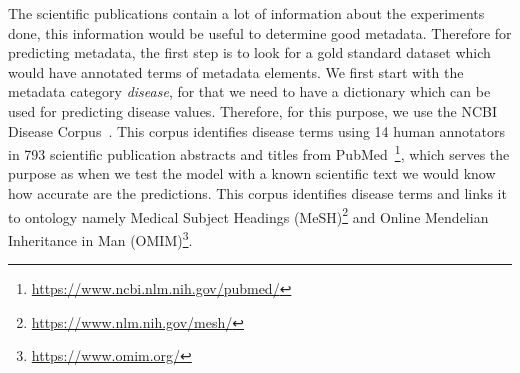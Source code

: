 The scientific publications contain a lot of information about the experiments done, this information would be useful to determine good metadata. Therefore for predicting metadata, the first step is to look for a gold standard dataset which would have annotated terms of metadata elements. We first start with the metadata category \emph{disease}, for that we need to have a dictionary which can be used for predicting disease values. Therefore, for this purpose, we use the NCBI Disease Corpus~\cite{dougan2014ncbi}. This corpus identifies disease terms using 14 human annotators in 793 scientific publication abstracts and titles from PubMed~\footnote{\url{https://www.ncbi.nlm.nih.gov/pubmed/}}, which serves the purpose as when we test the model with a known scientific text we would know how accurate are the predictions. This corpus identifies disease terms and links it to ontology namely Medical Subject Headings (MeSH)\footnote{\url{https://www.nlm.nih.gov/mesh/}} and Online Mendelian Inheritance in Man (OMIM)\footnote{\url{https://www.omim.org/}}. 

